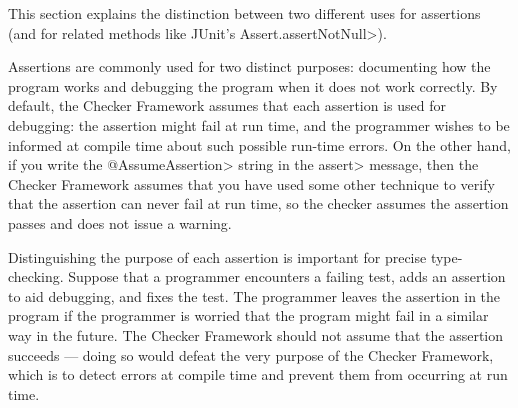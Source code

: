 




This section explains the distinction between two different uses for
assertions (and for related methods like JUnit's \<Assert.assertNotNull>).

Assertions are commonly used for two distinct purposes:  documenting how
the program works and debugging the program when it does not work
correctly.  By default, the Checker Framework assumes that each assertion
is used for debugging:  the assertion might fail at run time, and the programmer
wishes to be informed at compile time about such possible run-time errors.  On
the other hand, if you write the \<@AssumeAssertion> string in the \<assert>
message, then the Checker Framework assumes that you have used some other
technique to verify that the assertion can never fail at run time, so the
checker assumes the assertion passes and does not issue a warning.

Distinguishing the purpose of each assertion is important for precise
type-checking.
Suppose that a
programmer encounters a failing test, adds an assertion to aid debugging, and fixes the
test.  The programmer leaves the assertion in the program if the programmer
is worried that the program might fail in a similar way in the future.
The Checker Framework should not assume that the assertion succeeds ---
doing so would defeat the very purpose of the Checker Framework, which is
to detect errors at compile time and prevent them from occurring at run
time.

